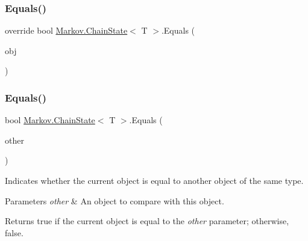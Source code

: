 \mbox{\label{class_markov_1_1_chain_state_a7774a491a81fcf44fd7777f3d58e57e5}} 
\subsubsection{\texorpdfstring{Equals()}{Equals()}\hspace{0.1cm}{\footnotesize\ttfamily [1/2]}}
{\footnotesize\ttfamily override bool \mbox{\hyperlink{class_markov_1_1_chain_state}{Markov.\+Chain\+State}}$<$ T $>$.Equals (\begin{DoxyParamCaption}\item[{object}]{obj }\end{DoxyParamCaption})}





\mbox{\label{class_markov_1_1_chain_state_ae7f0298aa37790cf06f6daf63e879c29}} 
\subsubsection{\texorpdfstring{Equals()}{Equals()}\hspace{0.1cm}{\footnotesize\ttfamily [2/2]}}
{\footnotesize\ttfamily bool \mbox{\hyperlink{class_markov_1_1_chain_state}{Markov.\+Chain\+State}}$<$ T $>$.Equals (\begin{DoxyParamCaption}\item[{\mbox{\hyperlink{class_markov_1_1_chain_state}{Chain\+State}}$<$ T $>$}]{other }\end{DoxyParamCaption})}



Indicates whether the current object is equal to another object of the same type. 


\begin{DoxyParams}{Parameters}
{\em other} & An object to compare with this object.\\
\hline
\end{DoxyParams}
\begin{DoxyReturn}{Returns}
true if the current object is equal to the {\itshape other}  parameter; otherwise, false.
\end{DoxyReturn}
\mbox{\label{class_markov_1_1_chain_state_a81c94c2203e25ac36ba1ddd178fc2b15}} 
